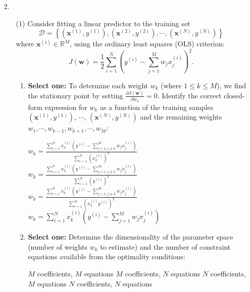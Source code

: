 \documentclass[11pt,addpoints,answers]{exam}
\newcommand{\xv}{\mathbf{x}}
\newcommand{\wv}{\mathbf{w}}
\newcommand{\Dc}{\mathcal{D}}
\newcommand{\sone}{\textbf{Select one: }}
\begin{document}
\begin{enumerate}
		\clearpage
		
		\item[2.] 
		\begin{enumerate}[label=\alph*), itemsep=10pt]
			\item[(1)] Consider fitting a linear predictor to the training set 
			$$
			\Dc = \left\{\left(\xv^{(1)},y^{(1)}\right), \left(\xv^{(2)},y^{(2)}\right),\cdots, \left(\xv^{(N)},y^{(N)}\right)\right\}
			$$ where $\xv^{(i)} \in \mathbb{R}^M$, using the ordinary least squares (OLS) criterion:
			$$
			J(\wv) = \frac{1}{2}\sum_{i=1}^N\left(y^{(i)} - \sum_{j=1}^M w_j x_j^{(i)}\right)^2.
			$$
			\begin{enumerate}[label=(\roman*), leftmargin=*]
				\item \sone
				To determine each weight $w_k$ (where $1\leq k\leq M$), we find the stationary point by setting $\frac{\partial J(\wv)}{\partial w_k} = 0$. Identify the correct closed-form expression for $w_k$ as a function of the training samples 
				$(\xv^{(1)},y^{(1)})$, $\cdots$, $(\xv^{(N)},y^{(N)})$ and the remaining weights $w_1,\cdots,w_{k-1},w_{k+1},\cdots,w_M$:
				
				\begin{checkboxes}
					\checkboxchar{$\Box$} \checkedchar{$\blacksquare$}
					\CorrectChoice $w_k = \frac{\sum_{i=1}^N x_k^{(i)}(y^{(i)}-\sum_{j=1,j\neq k}^M w_j x_j^{(i)})}{\sum_{i=1}^N (x_k^{(i)})^2}$
					\choice $w_k = \frac{\sum_{i=1}^N x_k^{(i)}(y^{(i)}-\sum_{j=1,j\neq k}^M w_j x_j^{(i)})}{\sum_{i=1}^N (y^{(i)})^2}$
					\choice $w_k = \frac{\sum_{i=1}^N x_k^{(i)}(y^{(i)}-\sum_{j=1,j\neq k}^M w_j x_j^{(i)})}{\sum_{i=1}^N (x_k^{(i)} y^{(i)})^2}$
					\choice $w_k = \sum_{i=1}^N x_k^{(i)}(y^{(i)}-\sum_{j=1}^M w_j x_j^{(i)})$
				\end{checkboxes}
				
				
				\vspace*{7mm}
				
				\item \sone Determine the dimensionality of the parameter space (number of weights $w_k$ to estimate) and the number of constraint equations available from the optimality conditions:
				
				\begin{checkboxes}
					\checkboxchar{$\Box$} \checkedchar{$\blacksquare$}
					\CorrectChoice $M$ coefficients, $M$ equations
					\choice $M$ coefficients, $N$ equations
					\choice $N$ coefficients, $M$ equations
					\choice $N$ coefficients, $N$ equations
				\end{checkboxes}
				

\end{enumerate}
\end{enumerate}
\end{enumerate}
\end{document}
